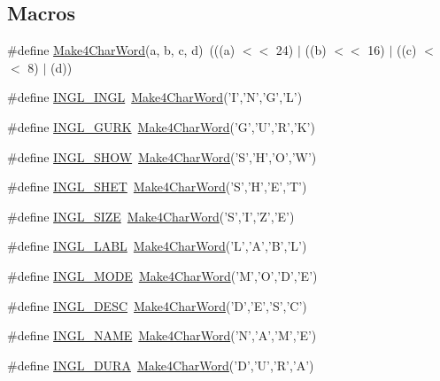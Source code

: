 \subsection*{Macros}
\begin{DoxyCompactItemize}
\item 
\#define \hyperlink{a00216_ae2d281bc898746a9ab78c70c5ccf73db}{Make4\-Char\-Word}(a, b, c, d)~(((a) $<$$<$ 24) $\vert$ ((b) $<$$<$ 16) $\vert$ ((c) $<$$<$ 8) $\vert$ (d))
\item 
\#define \hyperlink{a00216_a1656cd5348fc3cbd6c63c1394251cdba}{I\-N\-G\-L\-\_\-\-I\-N\-G\-L}~\hyperlink{a00216_ae2d281bc898746a9ab78c70c5ccf73db}{Make4\-Char\-Word}('I','N','G','L')
\item 
\#define \hyperlink{a00216_a7dcd3f55b97ae935548b73a30ccce597}{I\-N\-G\-L\-\_\-\-G\-U\-R\-K}~\hyperlink{a00216_ae2d281bc898746a9ab78c70c5ccf73db}{Make4\-Char\-Word}('G','U','R','K')
\item 
\#define \hyperlink{a00216_a2fd31b6c08a9e4b5160638340538c735}{I\-N\-G\-L\-\_\-\-S\-H\-O\-W}~\hyperlink{a00216_ae2d281bc898746a9ab78c70c5ccf73db}{Make4\-Char\-Word}('S','H','O','W')
\item 
\#define \hyperlink{a00216_a0aa6ebb8325caf7ad620ad870d29daf0}{I\-N\-G\-L\-\_\-\-S\-H\-E\-T}~\hyperlink{a00216_ae2d281bc898746a9ab78c70c5ccf73db}{Make4\-Char\-Word}('S','H','E','T')
\item 
\#define \hyperlink{a00216_a2d6437954c828f47d6b46372ab4f7fa0}{I\-N\-G\-L\-\_\-\-S\-I\-Z\-E}~\hyperlink{a00216_ae2d281bc898746a9ab78c70c5ccf73db}{Make4\-Char\-Word}('S','I','Z','E')
\item 
\#define \hyperlink{a00216_a36200655cee893833b5cd03264d75d62}{I\-N\-G\-L\-\_\-\-L\-A\-B\-L}~\hyperlink{a00216_ae2d281bc898746a9ab78c70c5ccf73db}{Make4\-Char\-Word}('L','A','B','L')
\item 
\#define \hyperlink{a00216_a9542c65c4ca321f7e53587b67721b042}{I\-N\-G\-L\-\_\-\-M\-O\-D\-E}~\hyperlink{a00216_ae2d281bc898746a9ab78c70c5ccf73db}{Make4\-Char\-Word}('M','O','D','E')
\item 
\#define \hyperlink{a00216_a35ba380487bfb1855ca063c1049e3f57}{I\-N\-G\-L\-\_\-\-D\-E\-S\-C}~\hyperlink{a00216_ae2d281bc898746a9ab78c70c5ccf73db}{Make4\-Char\-Word}('D','E','S','C')
\item 
\#define \hyperlink{a00216_a8c3df43b9069c1020caaaf5b08f23f6e}{I\-N\-G\-L\-\_\-\-N\-A\-M\-E}~\hyperlink{a00216_ae2d281bc898746a9ab78c70c5ccf73db}{Make4\-Char\-Word}('N','A','M','E')
\item 
\#define \hyperlink{a00216_aa353c4edca51904ff83b4f1b2b406dfb}{I\-N\-G\-L\-\_\-\-D\-U\-R\-A}~\hyperlink{a00216_ae2d281bc898746a9ab78c70c5ccf73db}{Make4\-Char\-Word}('D','U','R','A')
$$
\end{DoxyCompactItemize}
